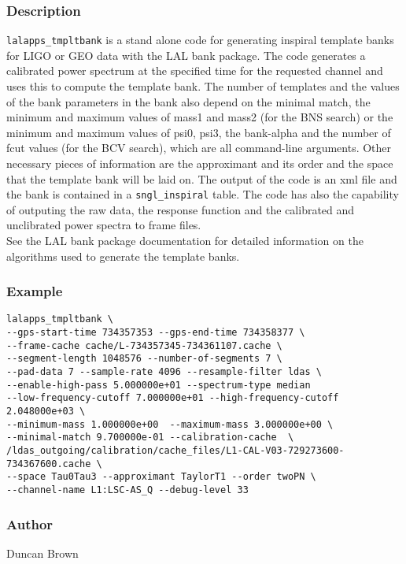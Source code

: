 \subsubsection{Description}
\begin{entry} 
\noindent \verb$lalapps_tmpltbank$ is a stand alone code for generating inspiral
template banks for LIGO or GEO data with the LAL bank package.  The code 
generates a calibrated power spectrum at the specified time for the 
requested channel and uses this to compute the template bank.  
The number of templates and the
values of the bank parameters in the bank also depend on the minimal
match, the
minimum and maximum values of mass1 and mass2 (for the BNS search) or the
minimum and maximum values of psi0, psi3, the bank-alpha and the number of
fcut values (for the BCV search), which are all command-line arguments.
Other necessary pieces of information are the approximant and its order and
the space that the template bank will be laid on. The output of the code is
an xml file and the bank is contained in a \verb$sngl_inspiral$ table. The code has
also the capability of outputing the raw data, the response function and the
calibrated and unclibrated power spectra to frame files.
\\
See the LAL bank package
documentation for detailed information on the algorithms used to generate the
template banks.
\end{entry}
\subsubsection{Example}
\begin{verbatim}
lalapps_tmpltbank \
--gps-start-time 734357353 --gps-end-time 734358377 \
--frame-cache cache/L-734357345-734361107.cache \
--segment-length 1048576 --number-of-segments 7 \
--pad-data 7 --sample-rate 4096 --resample-filter ldas \
--enable-high-pass 5.000000e+01 --spectrum-type median
--low-frequency-cutoff 7.000000e+01 --high-frequency-cutoff 2.048000e+03 \
--minimum-mass 1.000000e+00  --maximum-mass 3.000000e+00 \
--minimal-match 9.700000e-01 --calibration-cache  \
/ldas_outgoing/calibration/cache_files/L1-CAL-V03-729273600-734367600.cache \
--space Tau0Tau3 --approximant TaylorT1 --order twoPN \
--channel-name L1:LSC-AS_Q --debug-level 33

\end{verbatim}

\subsubsection{Author}
\noindent Duncan Brown

